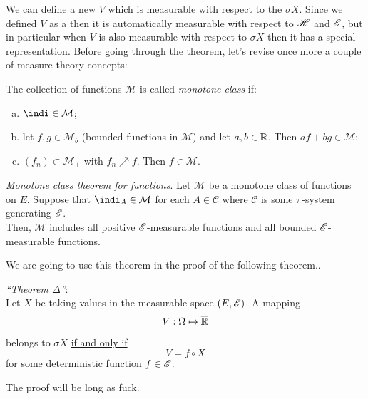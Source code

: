 \documentclass{report}
\begin{document}
We can define a new \rv{} $V$ which is measurable with respect to the \sa{} $\sigma X$. Since we defined $V$ as a \rv{} then it is automatically measurable with respect to $\mathscr{H}$ and $\mathscr{E}$, but in particular when $V$ is also measurable with respect to $\sigma X$ then it has a special representation. Before going through the theorem, let's revise once more a couple of measure theory concepts:
\begin{revise}
	\begin{definition}
		The collection of functions $\mathcal{M}$ is called \emph{monotone class} if:
		\begin{enumerate}[a)]
			\item $\indi\in\mathcal{M}$;
			\item let $f,g\in\mathcal{M}_b$ (bounded functions in $\mathcal{M}$) and let $a,b\in\mathbb{R}$. Then $af+bg\in\mathcal{M}$;
			\item $(f_n)\subset\mathcal{M}_+$ with $f_n\nearrow f$. Then $f\in\mathcal{M}$.
		\end{enumerate}
	\end{definition}
	\begin{theorem}
		\emph{Monotone class theorem for functions}.
		Let $\mathcal{M}$ be a monotone class of functions on $E$. Suppose that $\indi_A\in\mathcal{M}$ for each $A\in\mathcal{C}$ where $\mathcal{C}$ is some $\pi$-system generating $\mathscr{E}$.\\
		Then, $\mathcal{M}$ includes all positive $\mathscr{E}$-measurable functions and all bounded $\mathscr{E}$-measurable functions.
	\end{theorem}
\end{revise}
	We are going to use this theorem in the proof of the following theorem..
	\begin{theorem}\label{teodelta}
		\emph{``Theorem $\Delta$''}:\\
		Let $X$ be \rv{} taking values in the measurable space $(E,\mathscr{E})$. A mapping
		\[V:\Omega\mapsto\overline{\mathbb{R}}\]
		belongs to $\sigma X$ \underline{if and only if}
		\[V=f\circ X\]
		for some deterministic function $f\in\mathscr{E}$.
	\end{theorem}
The proof will be long as fuck.
\end{document}
